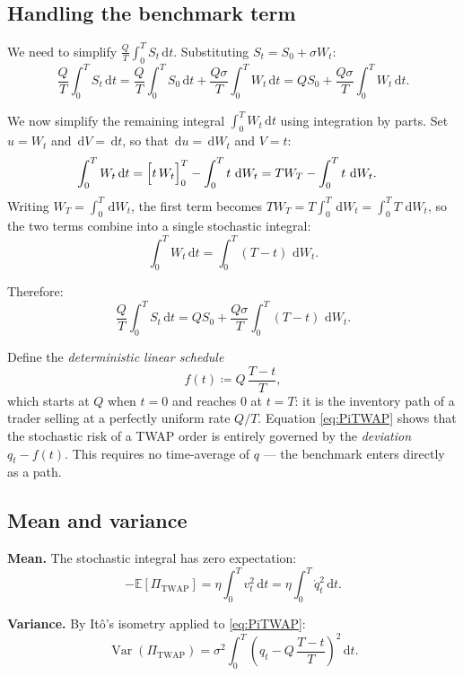 \documentclass[12pt, a4paper]{article}
\newcommand{\E}{\mathbb{E}}
\newcommand{\Var}{\operatorname{Var}}
\newcommand{\dd}{\,\mathrm{d}}
\begin{document}
\subsection{Handling the benchmark term}

We need to simplify $\frac{Q}{T}\int_0^T S_t \dd t$.
Substituting $S_t = S_0 + \sigma W_t$:
\[
  \frac{Q}{T}\int_0^T S_t \dd t
  = \frac{Q}{T}\!\int_0^T S_0 \dd t + \frac{Q\sigma}{T}\!\int_0^T W_t \dd t
  = QS_0 + \frac{Q\sigma}{T}\!\int_0^T W_t \dd t.
\]

We now simplify the remaining integral $\int_0^T W_t \dd t$
using integration by parts. Set $u = W_t$ and $\dd V = \dd t$,
so that $\dd u = \dd W_t$ and $V = t$:
\begin{align}
  \int_0^T W_t \dd t
  &= \Bigl[t\, W_t\Bigr]_0^T - \int_0^T t\, \dd W_t
   = T W_T - \int_0^T t\, \dd W_t.
   \label{eq:ibp-twap}
\end{align}
Writing $W_T = \int_0^T \dd W_t$, the first term becomes
$T W_T = T\int_0^T \dd W_t = \int_0^T T\,\dd W_t$,
so the two terms combine into a single stochastic integral:
\[
  \int_0^T W_t \dd t
  = \int_0^T (T - t)\,\dd W_t.
\]

Therefore:
\[
  \frac{Q}{T}\int_0^T S_t \dd t
  = QS_0 + \frac{Q\sigma}{T}\int_0^T (T-t)\,\dd W_t.
\]

\begin{keybox}
  Define the \emph{deterministic linear schedule}
  \[
    f(t) \coloneqq Q\,\frac{T-t}{T},
  \]
  which starts at $Q$ when $t=0$ and reaches $0$ at $t=T$:
  it is the inventory path of a trader selling at a perfectly uniform rate $Q/T$.
  Equation \eqref{eq:PiTWAP} shows that the stochastic risk of a TWAP order
  is entirely governed by the \emph{deviation} $q_t - f(t)$.
  This requires no time-average of $q$ — the benchmark enters directly as a path.
\end{keybox}


\subsection{Mean and variance}

\textbf{Mean.} The stochastic integral has zero expectation:
\[
  -\E[\Pi_{\mathrm{TWAP}}] = \eta\!\int_0^T v_t^2 \dd t = \eta\!\int_0^T \dot q_t^2 \dd t.
\]

\textbf{Variance.} By It\^{o}'s isometry applied to \eqref{eq:PiTWAP}:
\[
  \Var(\Pi_{\mathrm{TWAP}})
  = \sigma^2\!\int_0^T \!\left(q_t - Q\,\frac{T-t}{T}\right)^{\!2} \dd t.
\]
\end{document}
